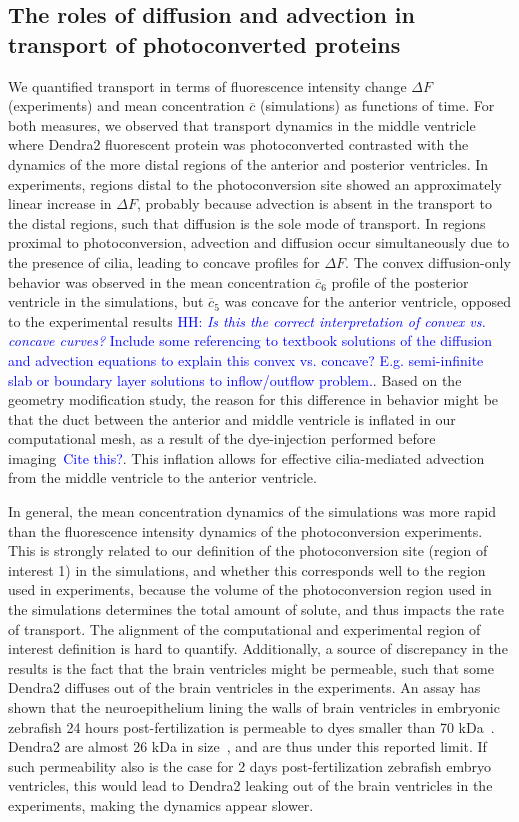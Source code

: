 \documentclass[fleqn]{wlscirep}
\newcommand{\lyng}[1]{\textcolor{blue}{#1}}
\begin{document}
\subsection*{The roles of diffusion and advection in transport of photoconverted proteins}
We quantified transport in terms of fluorescence intensity change $\Delta F$ (experiments) and mean concentration $\overline{c}$ (simulations) as functions of time. For both measures, we observed that transport dynamics in the middle ventricle where Dendra2 fluorescent protein was photoconverted contrasted with the dynamics of the more distal regions of the anterior and posterior ventricles. In experiments, regions distal to the photoconversion site showed an approximately linear increase in $\Delta F$, probably because advection is absent in the transport to the distal regions, such that diffusion is the sole mode of transport. In regions proximal to photoconversion, advection and diffusion occur simultaneously due to the presence of cilia, leading to concave profiles for $\Delta F$. The convex diffusion-only behavior was observed in the mean concentration $\overline{c}_6$ profile of the posterior ventricle in the simulations, but $\overline{c}_5$ was concave for the anterior ventricle, opposed to the experimental results \lyng{HH: \emph{Is this the correct interpretation of convex vs. concave curves?} Include some referencing to textbook solutions of the diffusion and advection equations to explain this convex vs. concave? E.g. semi-infinite slab or boundary layer solutions to inflow/outflow problem.}. Based on the geometry modification study, the reason for this difference in behavior might be that the duct between the anterior and middle ventricle is inflated in our computational mesh, as a result of the dye-injection performed before imaging~\lyng{Cite this?}. This inflation allows for effective cilia-mediated advection from the middle ventricle to the anterior ventricle.

In general, the mean concentration dynamics of the simulations was more rapid than the fluorescence intensity dynamics of the photoconversion experiments. This is strongly related to our definition of the photoconversion site (region of interest 1) in the simulations, and whether this corresponds well to the region used in experiments, because the volume of the photoconversion region used in the simulations determines the total amount of solute, and thus impacts the rate of transport. The alignment of the computational and experimental region of interest definition is hard to quantify. Additionally, a source of discrepancy in the results is the fact that the brain ventricles might be permeable, such that some Dendra2 diffuses out of the brain ventricles in the experiments. An assay has shown that the neuroepithelium lining the walls of brain ventricles in embryonic zebrafish 24 hours post-fertilization is permeable to dyes smaller than 70 kDa~\cite{Chang2012AnNeuroepithelium}. Dendra2 are almost 26 kDa in size~\cite{Gurskaya2006EngineeringLight}, and are thus under this reported limit. If such permeability also is the case for 2 days post-fertilization zebrafish embryo ventricles, this would lead to Dendra2 leaking out of the brain ventricles in the experiments, making the dynamics appear slower. 
\end{document}

